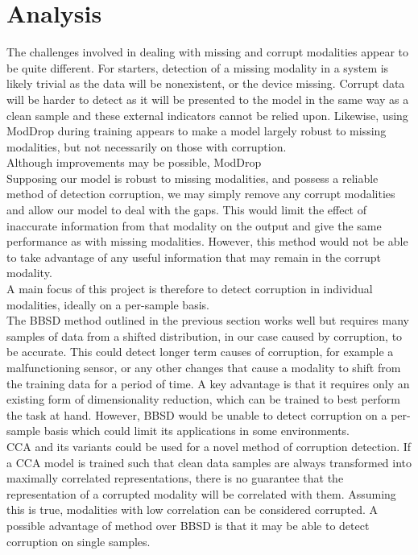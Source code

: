 \chapter{Analysis}
The challenges involved in dealing with missing and corrupt modalities appear to be quite different. For starters, detection of a missing modality in a system is likely trivial as the data will be nonexistent, or the device missing. Corrupt data will be harder to detect as it will be presented to the model in the same way as a clean sample and these external indicators cannot be relied upon. Likewise, using ModDrop \cite{ModDrop} during training appears to make a model largely robust to missing modalities, but not necessarily on those with corruption.\\

Although improvements may be possible, ModDrop \\

Supposing our model is robust to missing modalities, and possess a reliable method of detection corruption, we may simply remove any corrupt modalities and allow our model to deal with the gaps. This would limit the effect of inaccurate information from that modality on the output and give the same performance as with missing modalities. However, this method would not be able to take advantage of any useful information that may remain in the corrupt modality.\\

A main focus of this project is therefore to detect corruption in individual modalities, ideally on a per-sample basis. \\

The BBSD method outlined in the previous section works well but requires many samples of data from a shifted distribution, in our case caused by corruption, to be accurate. This could detect longer term causes of corruption, for example a malfunctioning sensor, or any other changes that cause a modality to shift from the training data for a period of time. A key advantage is that it requires only an existing form of dimensionality reduction, which can be trained to best perform the task at hand. However, BBSD would be unable to detect corruption on a per-sample basis which could limit its applications in some environments.\\

CCA and its variants could be used for a novel method of corruption detection. If a CCA model is trained such that clean data samples are always transformed into maximally correlated representations, there is no guarantee that the representation of a corrupted modality will be correlated with them. Assuming this is true, modalities with low correlation can be considered corrupted. A possible advantage of method over BBSD is that it may be able to detect corruption on single samples.\\

